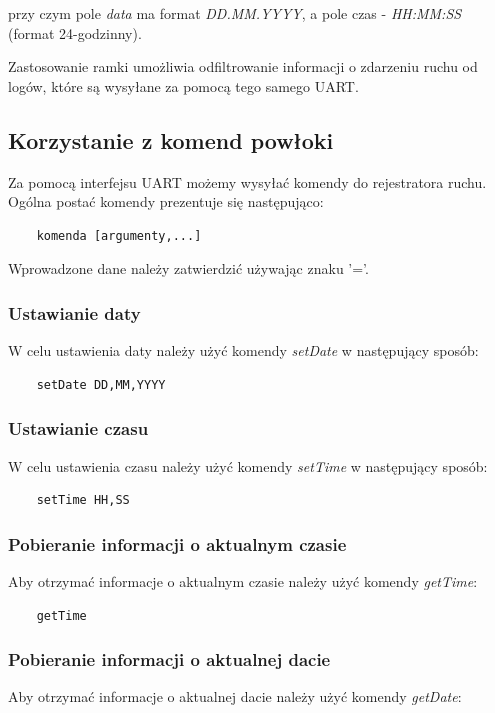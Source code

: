 \documentclass{article}
\begin{document}
przy czym pole \emph{data} ma format \emph{DD.MM.YYYY}, a pole czas - \emph{HH:MM:SS} (format 24-godzinny).

Zastosowanie ramki umożliwia odfiltrowanie informacji o zdarzeniu ruchu od logów, które
są wysyłane za pomocą tego samego UART.

\subsection{Korzystanie z komend powłoki}
Za pomocą interfejsu UART możemy wysyłać komendy do rejestratora ruchu. Ogólna postać komendy
prezentuje się następująco:

\begin{lstlisting}
    komenda [argumenty,...]
\end{lstlisting}

Wprowadzone dane należy zatwierdzić używając znaku '='.

\subsubsection{Ustawianie daty}
W celu ustawienia daty należy użyć komendy \emph{setDate} w następujący sposób:

\begin{lstlisting}
    setDate DD,MM,YYYY
\end{lstlisting}

\subsubsection{Ustawianie czasu}
W celu ustawienia czasu należy użyć komendy \emph{setTime} w następujący sposób:

\begin{lstlisting}
    setTime HH,SS
\end{lstlisting}

\subsubsection{Pobieranie informacji o aktualnym czasie}
Aby otrzymać informacje o aktualnym czasie należy użyć komendy \emph{getTime}:

\begin{lstlisting}
    getTime
\end{lstlisting}

\subsubsection{Pobieranie informacji o aktualnej dacie}
Aby otrzymać informacje o aktualnej dacie należy użyć komendy \emph{getDate}:
\end{document}
